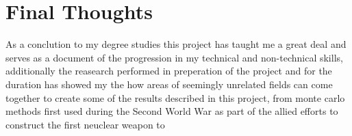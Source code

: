 \section{Final Thoughts}
As a conclution to my degree studies this project has taught me a great deal and serves as a document of the progression in my technical and
non-technical skills, additionally the reasearch performed in preperation of the project and for the duration has showed my the
how areas of seemingly unrelated fields can come together to create some of the results described in this project, from monte carlo methods
first used during the Second World War as part of the allied efforts to construct the first neuclear weapon to 
